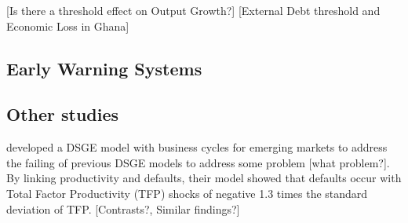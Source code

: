 \documentclass[14pt, a4paper]{article}
\begin{document}
	\cite{nersisyan2010does} %
	\cite{pescatori2014debt}
	
	\cite{wright2014determining}
	
	\cite{lof2014does} %
	\cite{GrowthBeyond}
	\cite{grennes2010finding} %
	\cite{Pattillo2011ExternalDA} %
	[Is there a threshold effect on Output Growth?] %
	[External Debt threshold and Economic Loss in Ghana] %
	
	\subsection{Early Warning Systems}
	\cite{Eichengreen2002PredictingAP}
	\cite{Paol-2009}
	\cite{manasse2003predicting}
	\cite{bulow1988sovereign} %
	\cite{J.P-1992} %
	
	\subsection{Other studies}
	\cite{mendoza2012general} developed a DSGE model with business cycles for emerging markets to address the failing of previous DSGE models to address some problem [what problem?]. By linking productivity and defaults, their model showed that defaults occur with Total Factor Productivity (TFP) shocks of negative 1.3 times the standard deviation of TFP. [Contrasts?, Similar findings?]
	\cite{alesina1989external} %
	\cite{Spilloversin}
	
	\cite{kraay2006external} %
	\cite{sachs1985external} %
	
	\cite{Faust-1995} %
	
\end{document}
